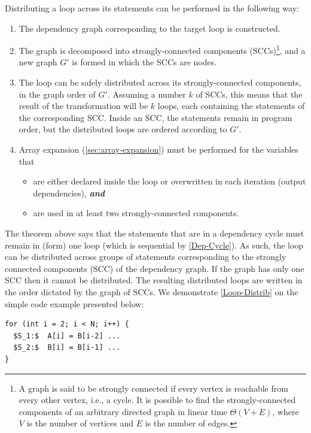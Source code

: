 \begin{theorem}\label{Loop-Distrib}
  Distributing a loop across its statements can be performed
  in the following way:
  \begin{enumerate}
  \item The dependency graph corresponding to the target loop
    is constructed.
  \item The graph is decomposed into strongly-connected components
    (SCCs)\footnote{
      A graph is said to be strongly connected if every vertex
      is reachable from every other vertex, i.e., a cycle.
      It is possible to find the strongly-connected components
      of an arbitrary directed graph in linear time $\Theta(V+E)$,
      where $V$ is the number of vertices and $E$ is the number of
      edges.
    }, and a new graph $G'$ is formed in which the SCCs are nodes.
  \item The loop can be safely distributed across its
    strongly-connected components, in the graph order of $G'$.
    Assuming a number $k$ of SCCs, this means that the result of the
    transformation will be $k$ loops, each containing the statements
    of the corresponding SCC. Inside an SCC, the statements remain in
    program order, but the distributed loops are ordered according to
    $G'$.
  \item Array expansion (\cref{sec:array-expansion}) must be performed
    for the variables that
    \begin{itemize}
    \item are either declared inside the loop or overwritten
      in each iteration (output dependencies), \textbf{\em and}
    \item are used in at least two strongly-connected components.
    \end{itemize}
  \end{enumerate}
\end{theorem}

The theorem above says that the statements that are in a dependency
cycle must remain in (form) one loop (which is sequential by
\cref{Dep-Cycle}). As such, the loop can be distributed across groups
of statements corresponding to the strongly connected components (SCC)
of the dependency graph. If the graph has only one SCC then it cannot
be distributed.  The resulting distributed loops are written in the
order dictated by the graph of SCCs.
%
We demonstrate \cref{Loop-Distrib} on the simple code example presented
below:
\begin{lstlisting}[mathescape=true]
for (int i = 2; i < N; i++) {
  $S_1:$  A[i] = B[i-2] ...
  $S_2:$  B[i] = B[i-1] ...
}
\end{lstlisting}


